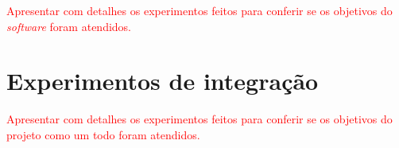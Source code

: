 \textcolor{red}{Apresentar com detalhes os experimentos feitos para conferir se os objetivos do \textit{software} foram atendidos.}

\section{Experimentos de integração}

\textcolor{red}{Apresentar com detalhes os experimentos feitos para conferir se os objetivos do projeto como um todo foram atendidos.}



